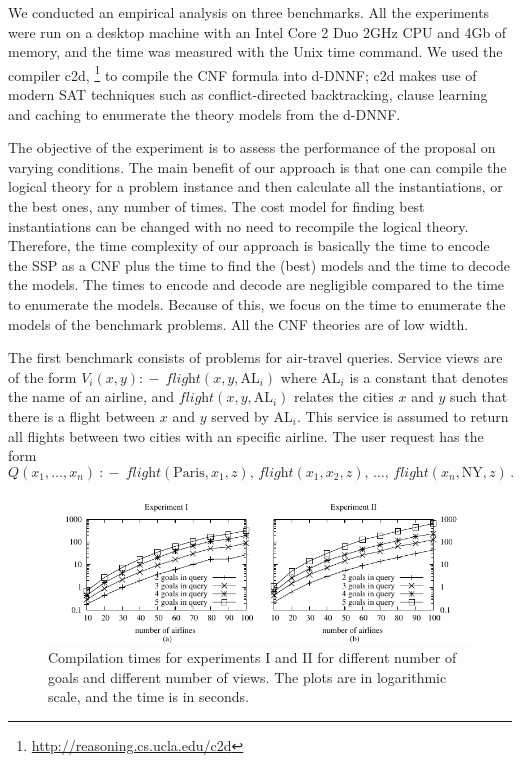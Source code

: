 \documentclass{llncs}
\newcommand{\qrule}{:\!\!-}
\newcommand{\flight}{\textit{flight}}
\newcommand{\PA}{\text{Paris}}
\newcommand{\NY}{\text{NY}}
\newcommand{\AL}{\text{AL}}
\begin{document}
We conducted an empirical analysis on three benchmarks.
All the experiments were run on a desktop machine with an Intel
Core 2 Duo 2GHz CPU and 4Gb of memory, and the time was measured
with the Unix time command. We used the
compiler c2d, \footnote{\url{http://reasoning.cs.ucla.edu/c2d}} to compile 
the CNF formula into d-DNNF\cite{darwiche:weighted}; c2d makes use of
modern SAT techniques such as conflict-directed backtracking, clause learning
and caching\cite{darwiche:compiler} to enumerate the theory models from the d-DNNF.

The objective of the experiment is to assess the performance of the proposal
on varying conditions. The main benefit of our approach is that one can compile
the logical theory for a problem instance and then calculate all the instantiations,
or the best ones, any number of times. The cost model for finding best instantiations
can be changed with no need to recompile the logical theory. Therefore,
the time complexity of our approach is basically the time to encode the SSP
as a CNF plus the time to find the (best) models and the time to decode the
models. The times to encode and decode are negligible compared to the time to
enumerate the models. Because of this, we focus on the time to enumerate the
models of the benchmark problems. All the CNF theories are of low width.

The first benchmark consists of problems for air-travel queries.
Service views are of the form $V_i(x,y)\qrule\ \flight(x,y,\AL_i)$
where $\AL_i$ is a constant that denotes the name of an airline, 
and $\flight(x,y,\AL_i)$ relates the cities $x$ and $y$ such that
there is a flight between $x$ and $y$ served by $\AL_i$. This 
service is assumed to return all flights between two cities with an
specific airline. The user request has the form 
\[ Q(x_1,\ldots,x_n)\ \qrule\ \flight(\PA,x_1,z),\,\flight(x_1,x_2,z),\,\ldots,\,\flight(x_n,\NY,z)\,. \]

\begin{figure}[t]
\centering
\includegraphics[width=1\textwidth]{plots/plot1}
\caption{Compilation times for experiments I and II for different
number of goals and different number of views. The plots are in
logarithmic scale, and the time is in seconds.}
\label{fig:plot1}
\end{figure}
\end{document}
